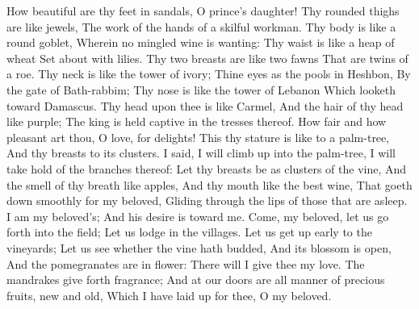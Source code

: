 How beautiful are thy feet in sandals, O prince’s daughter! Thy rounded thighs are like jewels, The work of the hands of a skilful workman.  Thy body is like a round goblet, Wherein no mingled wine is wanting: Thy waist is like a heap of wheat Set about with lilies.  Thy two breasts are like two fawns That are twins of a roe.  Thy neck is like the tower of ivory; Thine eyes as the pools in Heshbon, By the gate of Bath-rabbim; Thy nose is like the tower of Lebanon Which looketh toward Damascus.  Thy head upon thee is like Carmel, And the hair of thy head like purple; The king is held captive in the tresses thereof.  How fair and how pleasant art thou, O love, for delights!  This thy stature is like to a palm-tree, And thy breasts to its clusters.  I said, I will climb up into the palm-tree, I will take hold of the branches thereof: Let thy breasts be as clusters of the vine, And the smell of thy breath like apples,  And thy mouth like the best wine, That goeth down smoothly for my beloved, Gliding through the lips of those that are asleep.  I am my beloved’s; And his desire is toward me.  Come, my beloved, let us go forth into the field; Let us lodge in the villages.  Let us get up early to the vineyards; Let us see whether the vine hath budded, And its blossom is open, And the pomegranates are in flower: There will I give thee my love.  The mandrakes give forth fragrance; And at our doors are all manner of precious fruits, new and old, Which I have laid up for thee, O my beloved. 

